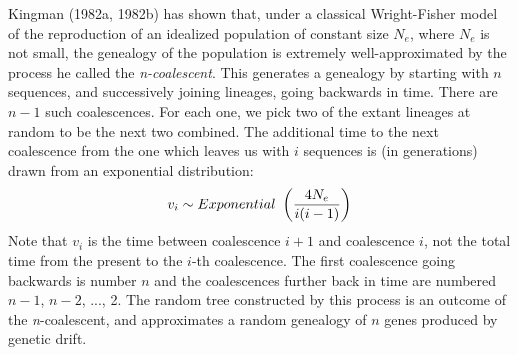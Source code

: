 Kingman (1982a, 1982b) has shown that, under a classical Wright-Fisher model
of the reproduction of an idealized population of constant size $N_e$, where
$N_e$ is not small, the genealogy of the population is extremely
well-approximated by the process he called the {\it n-coalescent}.  This
generates a genealogy by starting with $n$ sequences, and successively
joining lineages, going backwards in time.  There are $n-1$ such coalescences.
For each one, we pick two of the extant lineages at random to be the next
two combined.  The additional time to the next coalescence from the one
which leaves us with $i$ sequences is (in
generations) drawn from an exponential distribution:
\begin{equation} %
v_i \sim Exponential~\left({4N_e \over i(i-1)}\right)
\end{equation}
Note that $v_i$ is the time between coalescence $i+1$ and coalescence $i$,
not the total time from the present to the $i$-th coalescence.  The
first coalescence going backwards is number $n$ and the coalescences further
back in time are numbered $n-1$, $n-2$, ..., 2.  The random tree constructed by
this process is an outcome of the {\it n}-coalescent,
and approximates a random genealogy of $n$ genes produced by genetic drift.

